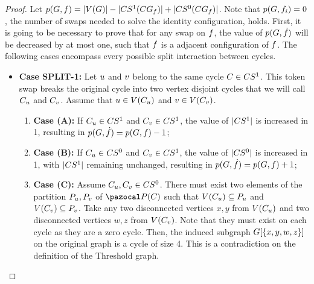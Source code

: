 \documentclass[msc,english,table,xcdraw]{ppgccufmg}
\begin{document}
\begin{proof}
Let $p(G, f) = |V(G)| - 
|CS^{1}(CG_{f})| +
|CS^{0}(CG_{f})|$.
Note that $p(G, f_{i}) = 0$, the number of swaps needed to
solve the identity configuration, holds.
First, it is going to be necessary to prove that for any swap on $f$,
the value of $p(G, \dot{f})$ will be decreased
by at most one, such that $\dot{f}$ is a adjacent configuration
of $f$.
The following cases encompass every possible split interaction between 
cycles.

\begin{itemize}
    \item \textbf{Case SPLIT-1:} Let $u$ and $v$ belong to 
    the same cycle $C \in CS^{1}$. 
    This token swap breaks the original cycle into two vertex disjoint cycles that
    we will call $C_{u}$ and $C_{v}$.
    Assume that $u \in V(C_{u})$ and 
    $v \in V(C_{v})$.
    
    \begin{enumerate}
        \item[] \textbf{Case (A):} If $C_{u} \in CS^{1}$ and 
        $C_{v} \in CS^{1}$, the value of $|CS^{1}|$ 
        is increased in 1, resulting in $p(G, \dot{f}) =
        p(G, f) - 1$;
        \item[] \textbf{Case (B):} If  $C_{u} \in CS^{0}$ and 
        $C_{v} \in CS^{1}$, the value of $|CS^{0}|$ 
        is increased in 1, with $|CS^{1}|$ remaining unchanged, 
        resulting in $p(G, \dot{f}) = p(G, f ) + 1$;
        \item[] \textbf{Case (C):} Assume $C_{u},C_{v} 
        \in CS^{0}$.
        There must exist two elements of the partition $P_{u},
        P_{v}$ of $\partitionFunc{\cycle}$ such that
        $V(C_{u}) \subseteq P_{u}$
        and $V(C_{v}) \subseteq P_{v}$.
        Take any two disconnected vertices $x,y$ from $V(C_{u})$
        and two disconnected vertices $w,z$ from $V(C_{v})$.
        Note that they must exist on each cycle as they are a zero cycle. 
        Then, the induced subgraph $G[\{x,y,w,z\}]$ on
        the original graph is a cycle of size 4.
        This is a contradiction on the definition of the Threshold graph. 
    \end{enumerate}
    

\end{itemize}
\end{proof}
\end{document}
